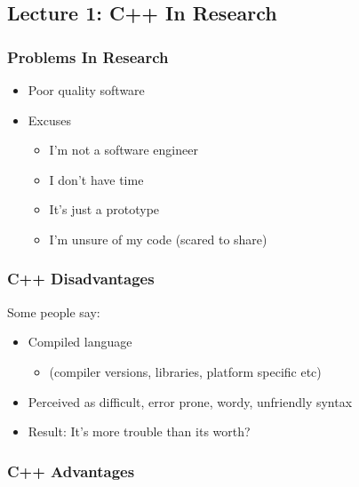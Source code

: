 \hypertarget{lecture-1-c-in-research}{%
\subsection{Lecture 1: C++ In Research}\label{lecture-1-c-in-research}}

\hypertarget{problems-in-research}{%
\subsubsection{Problems In Research}\label{problems-in-research}}

\begin{itemize}
\tightlist
\item
  Poor quality software
\item
  Excuses

  \begin{itemize}
  \tightlist
  \item
    I'm not a software engineer
  \item
    I don't have time
  \item
    It's just a prototype
  \item
    I'm unsure of my code (scared to share)
  \end{itemize}
\end{itemize}

\hypertarget{c-disadvantages}{%
\subsubsection{C++ Disadvantages}\label{c-disadvantages}}

Some people say:

\begin{itemize}
\tightlist
\item
  Compiled language

  \begin{itemize}
  \tightlist
  \item
    (compiler versions, libraries, platform specific etc)
  \end{itemize}
\item
  Perceived as difficult, error prone, wordy, unfriendly syntax
\item
  Result: It's more trouble than its worth?
\end{itemize}

\hypertarget{c-advantages}{%
\subsubsection{C++ Advantages}\label{c-advantages}}


